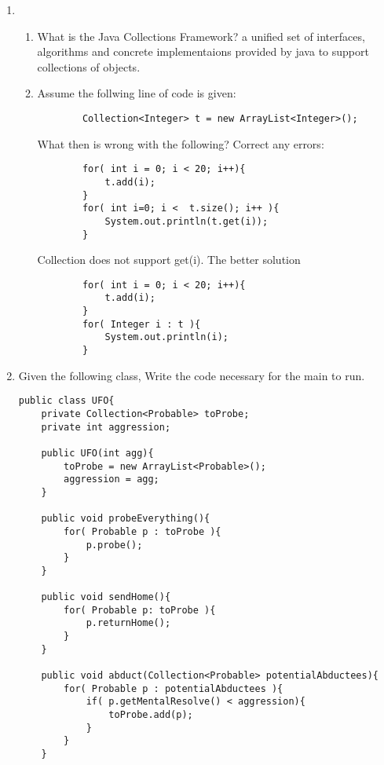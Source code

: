 \documentclass[11pt]{article}
\newenvironment{answer}{\large\lstset{basicstyle=\large}\color{white}}{}
\newenvironment{answer}{\large\lstset{basicstyle=\large}\color{red}}{}
\begin{document}
\begin{enumerate}
\item 
    \begin{enumerate} 
    \item What is the Java Collections Framework?
    \begin{answer}
        a unified set of interfaces, algorithms and concrete implementaions 
    provided by java to support collections of objects.
    \end{answer}
    \item Assume the follwing line of code is given:
    \begin{lstlisting}
        Collection<Integer> t = new ArrayList<Integer>();
    \end{lstlisting}
    What then is wrong with the following? Correct any errors:
    \begin{lstlisting}
        for( int i = 0; i < 20; i++){
            t.add(i);
        }
        for( int i=0; i <  t.size(); i++ ){
            System.out.println(t.get(i));
        }
    \end{lstlisting}
    \begin{answer}
    Collection does not support get(i). The better solution 
    \begin{lstlisting}
        for( int i = 0; i < 20; i++){
            t.add(i);
        }
        for( Integer i : t ){
            System.out.println(i);
        }

    \end{lstlisting}
    \end{answer}
    \end{enumerate}
    

\item Given the following class, Write the code necessary for the main to run.
\begin{lstlisting}
public class UFO{
    private Collection<Probable> toProbe;
    private int aggression;

    public UFO(int agg){
        toProbe = new ArrayList<Probable>();
        aggression = agg;
    }

    public void probeEverything(){
        for( Probable p : toProbe ){
            p.probe();
        }
    }

    public void sendHome(){
        for( Probable p: toProbe ){
            p.returnHome();
        }
    }

    public void abduct(Collection<Probable> potentialAbductees){
        for( Probable p : potentialAbductees ){
            if( p.getMentalResolve() < aggression){
                toProbe.add(p);
            }
        }
    }


\end{lstlisting}
\end{enumerate}
\end{document}
